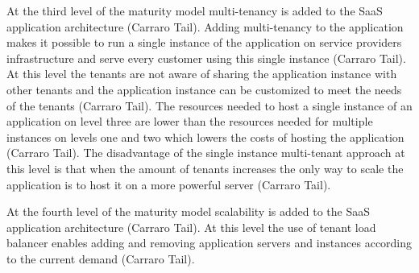 \documentclass[conference]{sasmoota2017}
\begin{document}
At the third level of the maturity model multi-tenancy is added to the SaaS application architecture (Carraro Tail). Adding multi-tenancy to the application makes it possible to run a single instance of the application on service providers infrastructure and serve every customer using this single instance (Carraro Tail). At this level the tenants are not aware of sharing the application instance with other tenants and the application instance can be customized to meet the needs of the tenants (Carraro Tail). The resources needed to host a single instance of an application on level three are lower than the resources needed for multiple instances on levels one and two which lowers the costs of hosting the application (Carraro Tail). The disadvantage of the single instance multi-tenant approach at this level is that when the amount of tenants increases the only way to scale the application is to host it on a more powerful server (Carraro Tail). 

At the fourth level of the maturity model scalability is added to the SaaS application architecture (Carraro Tail). At this level the use of tenant load balancer enables adding and removing application servers and instances according to the current demand (Carraro Tail). \cite{Bezemer:2010:MaintenanceDream}
\end{document}
